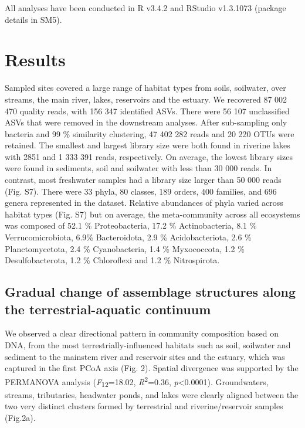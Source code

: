 \documentclass[12pt,a4paper]{article} %
\begin{document}
All analyses have been conducted in R v3.4.2 \citep{RCoreTeam2017} and RStudio v1.3.1073 \citep{RStudioTeam2016} (package details in SM5).

\section*{Results}
Sampled sites covered a large range of habitat types from soils, soilwater, over streams, the main river, lakes, reservoirs and the estuary. We recovered 87 002 470 quality reads, with 156 347 identified ASVs. There were 56 107 unclassified ASVs that were removed in the downstream analyses. After sub-sampling only bacteria and 99 \% similarity clustering, 47 402 282 reads and 20 220 OTUs were retained. The smallest and largest library size were both found in riverine lakes with 2851 and 1 333 391 reads, respectively. On average, the lowest library sizes were found in sediments, soil and soilwater with less than 30 000 reads. In contrast, most freshwater samples had a library size larger than 50 000 reads (Fig. S7). There were 33 phyla, 80 classes,  189 orders, 400 families, and 696 genera represented in the dataset. Relative abundances of phyla varied across habitat types (Fig. S7) but on average, the meta-community across all ecosystems was composed of 52.1 \% Proteobacteria, 17.2 \% Actinobacteria, 8.1 \% Verrucomicrobiota, 6.9\% Bacteroidota, 2.9 \% Acidobacteriota, 2.6 \% Planctomycetota, 2.4 \% Cyanobacteria, 1.4 \% Myxococcota, 1.2 \% Desulfobacterota, 1.2 \% Chloroflexi and 1.2 \% Nitrospirota.

\subsection*{Gradual change of assemblage structures along the terrestrial-aquatic continuum}
We observed a clear directional pattern in community composition based on DNA, from the most terrestrially-influenced habitats such as soil, soilwater and sediment to the mainstem river and reservoir sites and the estuary, which was captured in the first PCoA axis (Fig. 2). Spatial divergence was supported by the PERMANOVA analysis (\textit{F}\textsubscript{12}=18.02, \textit{R}\textsuperscript{2}=0.36, \textit{p}<0.0001). Groundwaters, streams, tributaries, headwater ponds, and lakes were clearly aligned between the two very distinct clusters formed by terrestrial and riverine/reservoir samples (Fig.2a).
\end{document}
